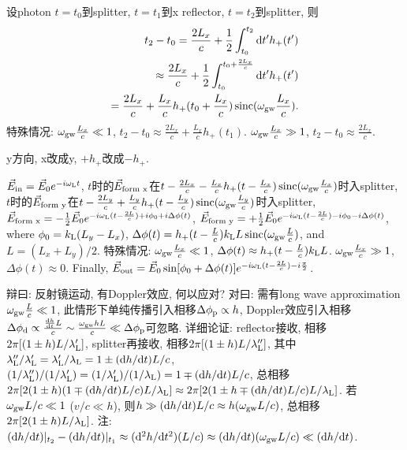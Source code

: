 设photon $t=t_0$到splitter, $t=t_1$到x reflector, $t=t_2$到splitter, 则
\begin{eqnarray}
    t_2-t_0=\frac{2L_x}{c}+\frac{1}{2}\int^{t_2}_{t_0}\mathrm{d} t'h_+(t')\\
    \approx\frac{2L_x}{c}+\frac{1}{2}\int^{t_0+\frac{2L_x}{c}}_{t_0}\mathrm{d} t'h_+(t')\\
    =\frac{2L_x}{c}+\frac{L_x}{c}h_+(t_0+\frac{L_x}{c})\operatorname{sinc}(\omega_\text{gw}\frac{L_x}{c}).
\end{eqnarray}
特殊情况: $\omega_\text{gw}\frac{L_x}{c}\ll1$, $t_2-t_0\approx\frac{2L_x}{c}+\frac{L_x}{c}h_+(t_1)$. $\omega_\text{gw}\frac{L_x}{c}\gg1$, $t_2-t_0\approx\frac{2L_x}{c}$.

y方向, x改成y, $+h_+$改成$-h_+$.

$\vec{E}_\text{in}=\vec{E}_0e^{-i\omega_\text{L}t}$, $t$时的$\vec{E}_\text{form x}$在$t-\frac{2L_x}{c}-\frac{L_x}{c}h_+(t-\frac{L_x}{c})\operatorname{sinc}(\omega_\text{gw}\frac{L_x}{c})$时入splitter, $t$时的$\vec{E}_\text{form y}$在$t-\frac{2L_y}{c}+\frac{L_y}{c}h_+(t-\frac{L_y}{c})\operatorname{sinc}(\omega_\text{gw}\frac{L_y}{c})$时入splitter, $\vec{E}_\text{form x}=-\frac{1}{2}\vec{E}_0e^{-i\omega_\text{L}(t-\frac{2L}{c})+i\phi_0+i\Delta\phi(t)}$, $\vec{E}_\text{form y}=+\frac{1}{2}\vec{E}_0e^{-i\omega_\text{L}(t-\frac{2L}{c})-i\phi_0-i\Delta\phi(t)}$, where $\phi_0=k_\text{L}(L_y-L_x)$, $\Delta\phi(t)=h_+(t-\frac{L}{c})k_\text{L}L\operatorname{sinc}(\omega_\text{gw}\frac{L}{c})$, and $L=(L_x+L_y)/2$. 特殊情况: $\omega_\text{gw}\frac{L_x}{c}\ll1$, $\Delta\phi(t)\approx h_+(t-\frac{L}{c})k_\text{L}L$. $\omega_\text{gw}\frac{L_x}{c}\gg1$, $\Delta\phi(t)\approx0$. Finally, $\vec{E}_\text{out}=\vec{E}_0\sin[\phi_0+\Delta\phi(t)]e^{-i\omega_\text{L}(t-\frac{2L}{c})-i\frac{\pi}{2}}$.

辩曰: 反射镜运动, 有Doppler效应, 何以应对? 对曰: 需有long wave approximation $\omega_\text{gw}\frac{L}{c}\ll1$, 此情形下单纯传播引入相移$\Delta\phi_\text{p}\propto h$, Doppler效应引入相移$\Delta\phi_\text{d}\propto \frac{\frac{\mathrm{d} h}{\mathrm{d} t}L}{c}\sim\frac{\omega_\text{gw}hL}{c}\ll\Delta\phi_\text{p}$可忽略. 详细论证: reflector接收, 相移$2\pi[(1\pm h)L/\lambda_\text{L}']$, splitter再接收, 相移$2\pi[(1\pm h)L/\lambda_\text{L}'']$, 其中$\lambda_\text{L}''/\lambda_\text{L}'=\lambda_\text{L}'/\lambda_\text{L}=1\pm(\mathrm{d} h/\mathrm{d} t)L/c$, $(1/\lambda_\text{L}'')/(1/\lambda_\text{L}')=(1/\lambda_\text{L}')/(1/\lambda_\text{L})=1\mp(\mathrm{d} h/\mathrm{d} t)L/c$, 总相移$2\pi[2(1\pm h)(1\mp(\mathrm{d} h/\mathrm{d} t)L/c)L/\lambda_\text{L}]\approx2\pi[2(1\pm h\mp(\mathrm{d} h/\mathrm{d} t)L/c)L/\lambda_\text{L}]$. 若$\omega_\text{gw}L/c\ll1$ ($v/c\ll h$), 则$h\gg(\mathrm{d} h/\mathrm{d} t)L/c\approx h(\omega_\text{gw}L/c)$, 总相移$2\pi[2(1\pm h)L/\lambda_\text{L}]$. 注: $(\mathrm{d} h/\mathrm{d} t)|_{t_2}-(\mathrm{d} h/\mathrm{d} t)|_{t_1}\approx(\mathrm{d}^2 h/\mathrm{d} t^2)(L/c)\approx(\mathrm{d} h/\mathrm{d} t)(\omega_\text{gw}L/c)\ll(\mathrm{d} h/\mathrm{d} t)$.
